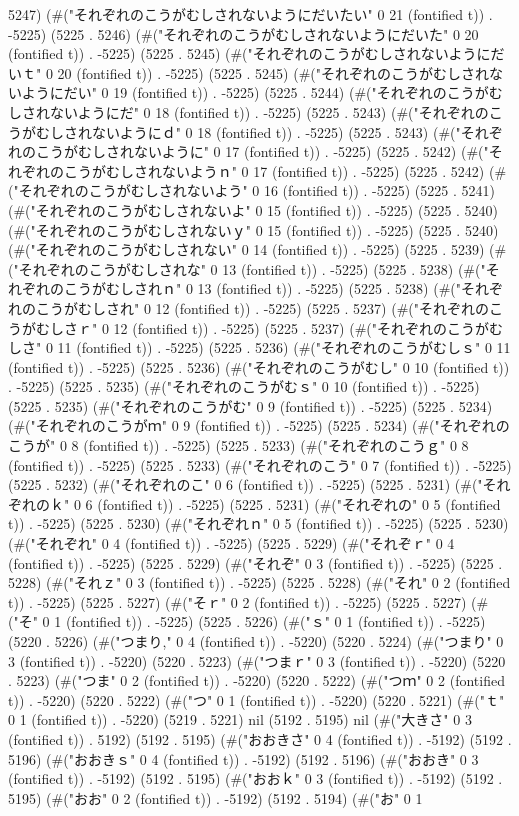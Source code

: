 5247) (#("それぞれのこうがむしされないようにだいたい" 0 21 (fontified t)) . -5225) (5225 . 5246) (#("それぞれのこうがむしされないようにだいた" 0 20 (fontified t)) . -5225) (5225 . 5245) (#("それぞれのこうがむしされないようにだいｔ" 0 20 (fontified t)) . -5225) (5225 . 5245) (#("それぞれのこうがむしされないようにだい" 0 19 (fontified t)) . -5225) (5225 . 5244) (#("それぞれのこうがむしされないようにだ" 0 18 (fontified t)) . -5225) (5225 . 5243) (#("それぞれのこうがむしされないようにｄ" 0 18 (fontified t)) . -5225) (5225 . 5243) (#("それぞれのこうがむしされないように" 0 17 (fontified t)) . -5225) (5225 . 5242) (#("それぞれのこうがむしされないようｎ" 0 17 (fontified t)) . -5225) (5225 . 5242) (#("それぞれのこうがむしされないよう" 0 16 (fontified t)) . -5225) (5225 . 5241) (#("それぞれのこうがむしされないよ" 0 15 (fontified t)) . -5225) (5225 . 5240) (#("それぞれのこうがむしされないｙ" 0 15 (fontified t)) . -5225) (5225 . 5240) (#("それぞれのこうがむしされない" 0 14 (fontified t)) . -5225) (5225 . 5239) (#("それぞれのこうがむしされな" 0 13 (fontified t)) . -5225) (5225 . 5238) (#("それぞれのこうがむしされｎ" 0 13 (fontified t)) . -5225) (5225 . 5238) (#("それぞれのこうがむしされ" 0 12 (fontified t)) . -5225) (5225 . 5237) (#("それぞれのこうがむしさｒ" 0 12 (fontified t)) . -5225) (5225 . 5237) (#("それぞれのこうがむしさ" 0 11 (fontified t)) . -5225) (5225 . 5236) (#("それぞれのこうがむしｓ" 0 11 (fontified t)) . -5225) (5225 . 5236) (#("それぞれのこうがむし" 0 10 (fontified t)) . -5225) (5225 . 5235) (#("それぞれのこうがむｓ" 0 10 (fontified t)) . -5225) (5225 . 5235) (#("それぞれのこうがむ" 0 9 (fontified t)) . -5225) (5225 . 5234) (#("それぞれのこうがｍ" 0 9 (fontified t)) . -5225) (5225 . 5234) (#("それぞれのこうが" 0 8 (fontified t)) . -5225) (5225 . 5233) (#("それぞれのこうｇ" 0 8 (fontified t)) . -5225) (5225 . 5233) (#("それぞれのこう" 0 7 (fontified t)) . -5225) (5225 . 5232) (#("それぞれのこ" 0 6 (fontified t)) . -5225) (5225 . 5231) (#("それぞれのｋ" 0 6 (fontified t)) . -5225) (5225 . 5231) (#("それぞれの" 0 5 (fontified t)) . -5225) (5225 . 5230) (#("それぞれｎ" 0 5 (fontified t)) . -5225) (5225 . 5230) (#("それぞれ" 0 4 (fontified t)) . -5225) (5225 . 5229) (#("それぞｒ" 0 4 (fontified t)) . -5225) (5225 . 5229) (#("それぞ" 0 3 (fontified t)) . -5225) (5225 . 5228) (#("それｚ" 0 3 (fontified t)) . -5225) (5225 . 5228) (#("それ" 0 2 (fontified t)) . -5225) (5225 . 5227) (#("そｒ" 0 2 (fontified t)) . -5225) (5225 . 5227) (#("そ" 0 1 (fontified t)) . -5225) (5225 . 5226) (#("ｓ" 0 1 (fontified t)) . -5225) (5220 . 5226) (#("つまり," 0 4 (fontified t)) . -5220) (5220 . 5224) (#("つまり" 0 3 (fontified t)) . -5220) (5220 . 5223) (#("つまｒ" 0 3 (fontified t)) . -5220) (5220 . 5223) (#("つま" 0 2 (fontified t)) . -5220) (5220 . 5222) (#("つｍ" 0 2 (fontified t)) . -5220) (5220 . 5222) (#("つ" 0 1 (fontified t)) . -5220) (5220 . 5221) (#("ｔ" 0 1 (fontified t)) . -5220) (5219 . 5221) nil (5192 . 5195) nil (#("大きさ" 0 3 (fontified t)) . 5192) (5192 . 5195) (#("おおきさ" 0 4 (fontified t)) . -5192) (5192 . 5196) (#("おおきｓ" 0 4 (fontified t)) . -5192) (5192 . 5196) (#("おおき" 0 3 (fontified t)) . -5192) (5192 . 5195) (#("おおｋ" 0 3 (fontified t)) . -5192) (5192 . 5195) (#("おお" 0 2 (fontified t)) . -5192) (5192 . 5194) (#("お" 0 1 
